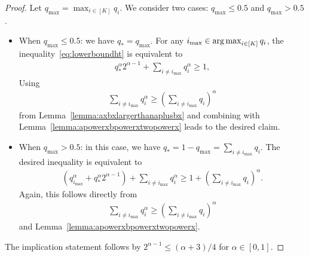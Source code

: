 \begin{proof}
    Let $q_{\max} = \max_{i \in [K]}q_i$.
    We consider two cases: $q_{\max} \leq 0.5$ and $q_{\max} > 0.5$.
    \begin{itemize}
        \item When $q_{\max} \leq 0.5$: we have $q_* = q_{\max}$. For any $i_{\max} \in \operatorname*{arg\,max}_{i \in [K]} q_i$, the inequality~\eqref{eq:lowerboundht} is equivalent to
        \begin{align}
            q_*^\alpha 2^{\alpha - 1} + \sum_{i \neq i_{\max}}q_i^\alpha \geq 1,
        \end{align}
        Using 
        \begin{align}
            \sum_{i \neq i_{\max}}q_i^\alpha \geq (\sum_{i \neq i_{\max}}q_i)^\alpha
        \end{align}
        from Lemma~\ref{lemma:axbxlargerthanaplusbx} and combining with Lemma~\ref{lemma:apowerxbpowerxtwopowerx} leads to the desired claim.

        \item When $q_{\max} > 0.5$: in this case, we have $q_* = 1 - q_{\max} = \sum_{i \neq i_{\max}}q_i$. The desired inequality is equivalent to 
        \begin{align}
            (q_{i_{\max}}^\alpha + q_*^\alpha 2^{\alpha-1}) + \sum_{i \neq i_{\max}}q_i^\alpha \geq 1 + (\sum_{i \neq i_{\max}}q_i)^\alpha.
        \end{align}
        Again, this follows directly from 
        \begin{align}
            \sum_{i \neq i_{\max}}q_i^\alpha \geq (\sum_{i \neq i_{\max}}q_i)^\alpha
        \end{align}
        and Lemma~\ref{lemma:apowerxbpowerxtwopowerx}.
    \end{itemize}
    The implication statement follows by $2^{\alpha-1} \leq (\alpha + 3)/4$ for $\alpha \in [0,1]$.
\end{proof}

